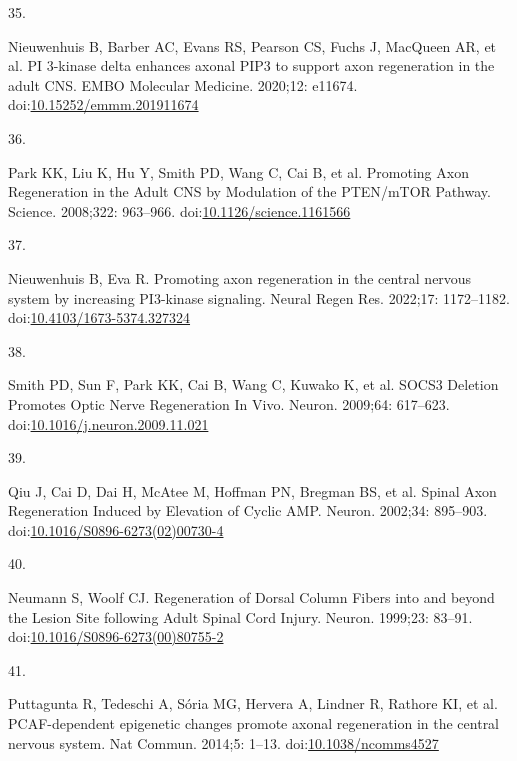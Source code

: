 \documentclass[
  12pt,
  a4paper,
]{book}
\newlength{\cslhangindent}
\newlength{\csllabelwidth}
\newenvironment{CSLReferences}[2] %
 {\begin{list}{}{%
  \setlength{\itemindent}{0pt}
  \setlength{\leftmargin}{0pt}
  \setlength{\parsep}{0pt}
  \ifodd #1
   \setlength{\leftmargin}{\cslhangindent}
   \setlength{\itemindent}{-1\cslhangindent}
  \fi
  \setlength{\itemsep}{#2\baselineskip}}}
 {\end{list}}
\newcommand{\CSLLeftMargin}[1]{\parbox[t]{\csllabelwidth}{\strut#1\strut}}
\newcommand{\CSLRightInline}[1]{\parbox[t]{\linewidth - \csllabelwidth}{\strut#1\strut}}
\begin{document}
\begin{CSLReferences}{0}{1}
\CSLLeftMargin{35. }%
\CSLRightInline{Nieuwenhuis B, Barber AC, Evans RS, Pearson CS, Fuchs J, MacQueen AR, et al. {PI} 3-kinase delta enhances axonal {PIP3} to support axon regeneration in the adult {CNS}. EMBO Molecular Medicine. 2020;12: e11674. doi:\href{https://doi.org/10.15252/emmm.201911674}{10.15252/emmm.201911674}}

\CSLLeftMargin{36. }%
\CSLRightInline{Park KK, Liu K, Hu Y, Smith PD, Wang C, Cai B, et al. Promoting {Axon Regeneration} in the {Adult CNS} by {Modulation} of the {PTEN}/{mTOR Pathway}. Science. 2008;322: 963--966. doi:\href{https://doi.org/10.1126/science.1161566}{10.1126/science.1161566}}

\CSLLeftMargin{37. }%
\CSLRightInline{Nieuwenhuis B, Eva R. Promoting axon regeneration in the central nervous system by increasing {PI3-kinase} signaling. Neural Regen Res. 2022;17: 1172--1182. doi:\href{https://doi.org/10.4103/1673-5374.327324}{10.4103/1673-5374.327324}}

\CSLLeftMargin{38. }%
\CSLRightInline{Smith PD, Sun F, Park KK, Cai B, Wang C, Kuwako K, et al. {SOCS3 Deletion Promotes Optic Nerve Regeneration In Vivo}. Neuron. 2009;64: 617--623. doi:\href{https://doi.org/10.1016/j.neuron.2009.11.021}{10.1016/j.neuron.2009.11.021}}

\CSLLeftMargin{39. }%
\CSLRightInline{Qiu J, Cai D, Dai H, McAtee M, Hoffman PN, Bregman BS, et al. Spinal {Axon Regeneration Induced} by {Elevation} of {Cyclic AMP}. Neuron. 2002;34: 895--903. doi:\href{https://doi.org/10.1016/S0896-6273(02)00730-4}{10.1016/S0896-6273(02)00730-4}}

\CSLLeftMargin{40. }%
\CSLRightInline{Neumann S, Woolf CJ. Regeneration of {Dorsal Column Fibers} into and beyond the {Lesion Site} following {Adult Spinal Cord Injury}. Neuron. 1999;23: 83--91. doi:\href{https://doi.org/10.1016/S0896-6273(00)80755-2}{10.1016/S0896-6273(00)80755-2}}

\CSLLeftMargin{41. }%
\CSLRightInline{Puttagunta R, Tedeschi A, Sória MG, Hervera A, Lindner R, Rathore KI, et al. {PCAF-dependent} epigenetic changes promote axonal regeneration in the central nervous system. Nat Commun. 2014;5: 1--13. doi:\href{https://doi.org/10.1038/ncomms4527}{10.1038/ncomms4527}}


\end{CSLReferences}
\end{document}
